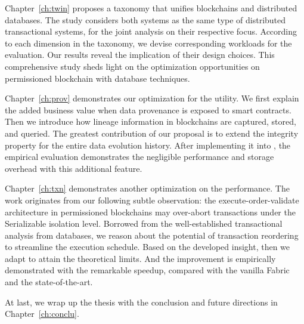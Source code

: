 Chapter~\ref{ch:twin} proposes a taxonomy that unifies blockchains and distributed databases. 
The study considers both systems as the same type of distributed transactional systems, for the joint analysis on their respective focus. 
According to each dimension in the taxonomy, we devise corresponding workloads for the evaluation. 
Our results reveal the implication of their design choices. 
This comprehensive study sheds light on the optimization opportunities on permissioned blockchain with database techniques. 

Chapter~\ref{ch:prov} demonstrates our optimization for the utility. 
We first explain the added business value when data provenance is exposed to smart contracts. 
Then we introduce how lineage information in blockchains are captured, stored, and queried. 
The greatest contribution of our proposal is to extend the integrity property for the entire data evolution history. 
After implementing it into {\fs}, the empirical evaluation demonstrates the negligible performance and storage overhead with this additional feature. 

Chapter~\ref{ch:txn} demonstrates another optimization on the performance. 
The work originates from our following subtle observation:
the execute-order-validate architecture in permissioned blockchains may over-abort transactions under the Serializable isolation level. 
Borrowed from the well-established transactional analysis from databases, we reason about the potential of transaction reordering to streamline the execution schedule. Based on the developed insight, then we adapt {\fs} to attain the theoretical limits. 
And the improvement is empirically demonstrated with the remarkable speedup, compared with the vanilla Fabric and the state-of-the-art. 

At last, we wrap up the thesis with the conclusion and future directions in Chapter~\ref{ch:conclu}. 

